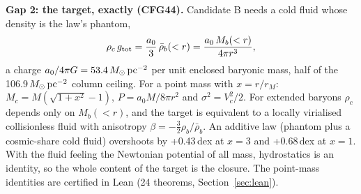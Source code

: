 \documentclass[10pt]{article}
\begin{document}
\textbf{Gap 2: the target, exactly (CFG44).} Candidate B needs a cold fluid whose density is the law's phantom,
\begin{equation}
\rho_c\,g_{\rm tot}=\frac{a_0}{3}\,\bar\rho_b(<r)=\frac{a_0\,M_b(<r)}{4\pi r^3},\label{eq:target}
\end{equation}
a charge $a_0/4\pi G=53.4\,M_\odot\,{\rm pc}^{-2}$ per unit enclosed baryonic mass, half of the 106.9\,$M_\odot\,{\rm pc}^{-2}$ column ceiling. For a point mass with $x=r/r_M$: $M_c=M(\sqrt{1+x^2}-1)$, $P=a_0M/8\pi r^2$ and $\sigma^2=V_c^2/2$. For extended baryons $\rho_c$ depends only on $M_b(<r)$, and the target is equivalent to a locally virialised collisionless fluid with anisotropy $\beta=-\tfrac32\rho_b/\bar\rho_b$. An additive law (phantom plus a cosmic-share cold fluid) overshoots by +0.43\,dex at $x=3$ and +0.68\,dex at $x=1$. With the fluid feeling the Newtonian potential of all mass, hydrostatics is an identity, so the whole content of the target is the closure. The point-mass identities are certified in Lean (24 theorems, Section~\ref{sec:lean}).
\end{document}
